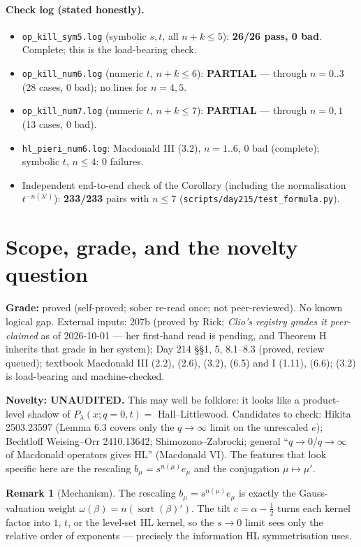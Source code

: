 \documentclass[11pt]{article}
\theoremstyle{definition}
\newtheorem*{remark}{Remark}
\newcommand{\sort}{\operatorname{sort}}
\newcommand{\file}[1]{\texttt{#1}}
\begin{document}
\paragraph{Check log (stated honestly).}
\begin{itemize}
\item \file{op\_kill\_sym5.log} (symbolic $s,t$, all $n+k\le5$): \textbf{26/26 pass, 0 bad}. Complete; this is the load-bearing check.
\item \file{op\_kill\_num6.log} (numeric $t$, $n+k\le6$): \textbf{PARTIAL} --- through $n=0..3$ (28 cases, 0 bad); no lines for $n=4,5$.
\item \file{op\_kill\_num7.log} (numeric $t$, $n+k\le7$): \textbf{PARTIAL} --- through $n=0,1$ (13 cases, 0 bad).
\item \file{hl\_pieri\_num6.log}: Macdonald III (3.2), $n=1..6$, 0 bad (complete); symbolic $t$, $n\le4$: 0 failures.
\item Independent end-to-end check of the Corollary (including the normalisation $t^{-n(\lambda')}$): \textbf{233/233} pairs with $n\le7$ (\file{scripts/day215/test\_formula.py}).
\end{itemize}

\section{Scope, grade, and the novelty question}

\textbf{Grade:} proved (self-proved; sober re-read once; not peer-reviewed). No known logical gap. External inputs: 207b (proved by Rick; \emph{Clio's registry grades it peer-claimed} as of 2026-10-01 --- her first-hand read is pending, and Theorem H inherits that grade in her system); Day 214 \S\S1, 5, 8.1--8.3 (proved, review queued); textbook Macdonald III (2.2), (2.6), (3.2), (6.5) and I (1.11), (6.6); (3.2) is load-bearing and machine-checked.

\textbf{Novelty: UNAUDITED.} This may well be folklore: it looks like a product-level shadow of $P_\lambda(x;q=0,t)=$ Hall--Littlewood. Candidates to check: Hikita 2503.23597 (Lemma 6.3 covers only the $q\to\infty$ limit on the unrescaled $e$); Bechtloff Weising--Orr 2410.13642; Shimozono--Zabrocki; general ``$q\to0$/$q\to\infty$ of Macdonald operators gives HL'' (Macdonald VI). The features that look specific here are the rescaling $b_\mu=s^{n(\mu)}e_\mu$ and the conjugation $\mu\mapsto\mu'$.

\begin{remark}[Mechanism]
The rescaling $b_\mu=s^{n(\mu)}e_\mu$ is exactly the Gauss-valuation weight $\omega(\beta)=n(\sort(\beta)')$. The tilt $c=\alpha-\frac12$ turns each kernel factor into $1$, $t$, or the level-set HL kernel, so the $s\to0$ limit sees only the relative order of exponents --- precisely the information HL symmetrisation uses.
\end{remark}
\end{document}
